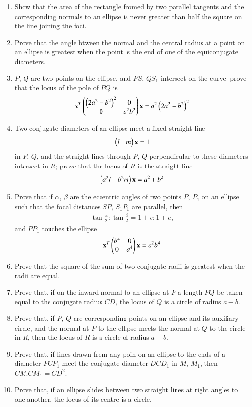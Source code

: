\begin{enumerate}[label=\arabic*.,ref=\thesubsection.\theenumi]
\item Show that the area of the rectangle fromed by two parallel tangents and the corresponding
normals to an ellipse is never greater than half the square on the line joining the foci.
\item Prove that the angle btween the normal and the central radius at a point on an ellipse
is greatest when the point is the end of one of the equiconjugate diameters.
\item $P$, $Q$ are two points on the ellipse, and $PS$, $QS_1$ intersect on the curve, prove that the locus of the pole of $PQ$ is
\begin{align}
\mathbf{x}^T\begin{pmatrix}\left(2a^2-b^2\right)^2 & 0\\0 & a^2b^2\end{pmatrix}\mathbf{x} =a^2\left(2a^2-b^2\right)^2
\end{align}
\item Two conjugate diameters of an ellipse meet a fixed straight line 
\begin{align}
\begin{pmatrix}l & m\end{pmatrix}\mathbf{x} = 1
\end{align}
 in $P$, $Q$, and the straight lines
through $P$, $Q$ perpendicular to these diameters intersect in $R$;  prove that the locus of
$R$ is the straight line
\begin{align}
\begin{pmatrix}a^2l & b^2m\end{pmatrix}\mathbf{x} = a^2+b^2
\end{align}
\item Prove that if $\alpha$, $\beta$ are the eccentric angles of two points $P$, $P_1$ on an ellipse such that
the focal distances $SP$, $S_1P_1$ are parallel, then 
\begin{align}
\tan\frac{\alpha}{2}:\tan\frac{\beta}{2} = 1\pm e: 1\mp e,
\end{align}
and $PP_1$ touches the ellipse
\begin{align}
\mathbf{x}^T\begin{pmatrix}b^4 & 0\\0 & a^4\end{pmatrix}\mathbf{x} =a^2b^4
\end{align}
\item Prove that the square of the sum of two conjugate radii is greatest when the radii are equal.
\item Prove that, if on the inward normal to an ellipse at $P$ a length $PQ$ be taken
equal to the conjugate radius $CD$, the locus of $Q$ is a circle of radius $a-b$.
\item Prove that, if $P$, $Q$ are corresponding points on an ellipse and its auxiliary circle, and the
normal at $P$ to the ellipse meets the normal at $Q$ to the circle in $R$, then the locus of $R$ is a circle of radius $a+b$.
\item Prove that, if lines drawn from any poin on an ellipse to the ends of a diameter $PCP_1$ meet the conjugate
diameter $DCD_1$ in $M$, $M_1$, then $CM.CM_1=CD^2$.
\item Prove that, if an ellipse slides between two straight lines
at right angles to one another, the locus of its centre is a circle.
\end{enumerate}
